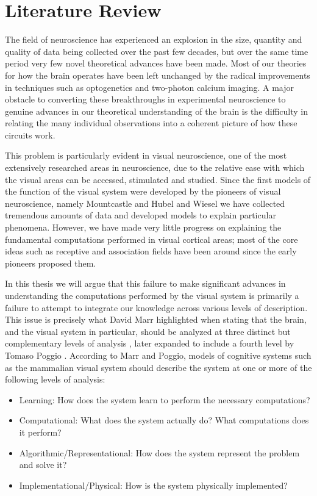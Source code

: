 \chapter{Literature Review}

The field of neuroscience has experienced an explosion in the size,
quantity and quality of data being collected over the past few
decades, but over the same time period very few novel theoretical
advances have been made. Most of our theories for how the brain
operates have been left unchanged by the radical improvements in
techniques such as optogenetics and two-photon calcium imaging. A
major obstacle to converting these breakthroughs in experimental
neuroscience to genuine advances in our theoretical understanding of
the brain is the difficulty in relating the many individual
observations into a coherent picture of how these circuits work.

This problem is particularly evident in visual neuroscience, one of
the most extensively researched areas in neuroscience, due to the
relative ease with which the visual areas can be accessed, stimulated
and studied. Since the first models of the function of the visual
system were developed by the pioneers of visual neuroscience, namely
Mountcastle and Hubel and Wiesel we have collected tremendous amounts
of data and developed models to explain particular phenomena. However,
we have made very little progress on explaining the fundamental
computations performed in visual cortical areas; most of the core
ideas such as receptive and association fields have been around since
the early pioneers proposed them.

In this thesis we will argue that this failure to make significant
advances in understanding the computations performed by the visual
system is primarily a failure to attempt to integrate our knowledge
across various levels of description. This issue is precisely what
David Marr highlighted when stating that the brain, and the visual
system in particular, should be analyzed at three distinct but
complementary levels of analysis \citep{Marr1982}, later expanded to
include a fourth level by Tomaso Poggio \citep{Poggio2012}. According
to Marr and Poggio, models of cognitive systems such as the mammalian
visual system should describe the system at one or more of the
following levels of analysis:

\begin{itemize}
\item Learning: How does the system learn to perform the necessary
  computations?
\item Computational: What does the system actually do? What
  computations does it perform?
\item Algorithmic/Representational: How does the system represent the
  problem and solve it?
\item Implementational/Physical: How is the system physically
  implemented?
\end{itemize}

